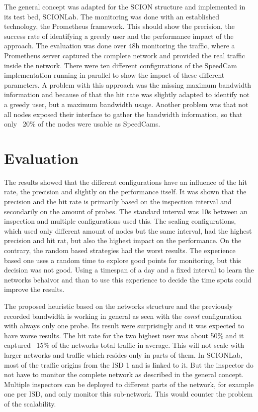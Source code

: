 \documentclass[thesis.tex]{subfiles}
\begin{document}
The general concept was adapted for the SCION structure and implemented in its test bed, SCIONLab. The monitoring was done with an established technology, the Prometheus framework. This should show the precision, the success rate of identifying a greedy user and the performance impact of the approach. The evaluation was done over 48h monitoring the traffic, where a Prometheus server captured the complete network and provided the real traffic inside the network. There were ten different configurations of the SpeedCam implementation running in parallel to show the impact of these different parameters. A problem with this approach was the missing maximum bandwidth information and because of that the hit rate was slightly adapted to identify not a greedy user, but a maximum bandwidth usage. Another problem was that not all nodes exposed their interface to gather the bandwidth information, so that only ~20\% of the nodes were usable as SpeedCams.

\section{Evaluation}
The results showed that the different configurations have an influence of the hit rate, the precision and slightly on the performance itself. It was shown that the precision and the hit rate is primarily based on the inspection interval and secondarily on the amount of probes. The standard interval was 10s between an inspection and multiple configurations used this. The scaling configurations, which used only different amount of nodes but the same interval, had the highest precision and hit rat, but also the highest impact on the performance. On the contrary, the random based strategies had the worst results. The experience based one uses a random time to explore good points for monitoring, but this decision was not good. Using a timespan of a day and a fixed interval to learn the networks behaivor and than to use this experience to decide the time spots could improve the results.

The proposed heuristic based on the networks structure and the previously recorded bandwidth is working in general as seen with the \textit{const} configuration with always only one probe. Its result were surprisingly and it was expected to have worse results. The hit rate for the two highest user was about 50\% and it captured ~15\% of the networks total traffic in average. This will not scale with larger networks and traffic which resides only in parts of them. In SCIONLab, most of the traffic origins from the ISD 1 and is linked to it. But the inspector do not have to monitor the complete network as described in the general concept. Multiple inspectors can be deployed to different parts of the network, for example one per ISD, and only monitor this sub-network. This would counter the problem of the scalability.
\end{document}
